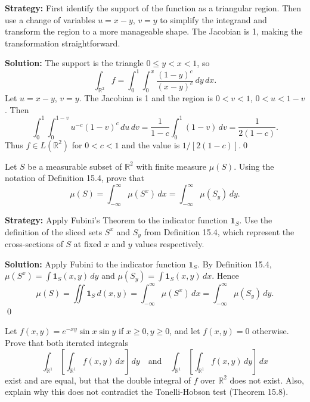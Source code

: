 \noindent\textbf{Strategy:} First identify the support of the function as a triangular region. Then use a change of variables \(u = x-y\), \(v = y\) to simplify the integrand and transform the region to a more manageable shape. The Jacobian is 1, making the transformation straightforward.

\bigskip\noindent\textbf{Solution:}
The support is the triangle \(0\le y < x < 1\), so
\[
\int_{\mathbb{R}^2} f = \int_0^1\!\int_0^x \frac{(1-y)^c}{(x-y)^c}\,dy\,dx.
\]
Let \(u=x-y\), \(v=y\). The Jacobian is 1 and the region is \(0<v<1\), \(0<u<1-v\). Then
\[
\int_0^1\!\int_0^{1-v} u^{-c}(1-v)^c\,du\,dv
= \frac{1}{1-c}\int_0^1 (1-v)\,dv = \frac{1}{2(1-c)}.
\]
Thus \(f\in L(\mathbb{R}^2)\) for \(0<c<1\) and the value is \(1/[2(1-c)]\).\qed


\begin{problembox}
\begin{problemstatement}
Let \( S \) be a measurable subset of \( \mathbb{R}^2 \) with finite measure \( \mu(S) \). Using the notation of Definition 15.4, prove that
\[
\mu(S) = \int_{-\infty}^{\infty} \mu(S^x) \, dx = \int_{-\infty}^{\infty} \mu(S_y) \, dy.
\]
\end{problemstatement}
\end{problembox}

\noindent\textbf{Strategy:} Apply Fubini's Theorem to the indicator function \(\mathbf{1}_S\). Use the definition of the sliced sets \(S^x\) and \(S_y\) from Definition 15.4, which represent the cross-sections of \(S\) at fixed \(x\) and \(y\) values respectively.

\bigskip\noindent\textbf{Solution:}
Apply Fubini to the indicator function \(\mathbf{1}_S\). By Definition 15.4, \(\mu(S^x)=\int \mathbf{1}_S(x,y)\,dy\) and \(\mu(S_y)=\int \mathbf{1}_S(x,y)\,dx\). Hence
\[
\mu(S)=\iint \mathbf{1}_S\,d(x,y)=\int_{-\infty}^{\infty}\!\mu(S^x)\,dx=\int_{-\infty}^{\infty}\!\mu(S_y)\,dy.
\]\qed


\begin{problembox}
\begin{problemstatement}
Let \( f(x, y) = e^{-xy} \sin x \sin y \) if \( x \geq 0, y \geq 0 \), and let \( f(x, y) = 0 \) otherwise. Prove that both iterated integrals
\[
\int_{\mathbb{R}^1} \left[ \int_{\mathbb{R}^1} f(x, y) \, dx \right] \, dy \quad \text{and} \quad \int_{\mathbb{R}^1} \left[ \int_{\mathbb{R}^1} f(x, y) \, dy \right] \, dx
\]
exist and are equal, but that the double integral of \( f \) over \( \mathbb{R}^2 \) does not exist. Also, explain why this does not contradict the Tonelli-Hobson test (Theorem 15.8).
\end{problemstatement}
\end{problembox}

